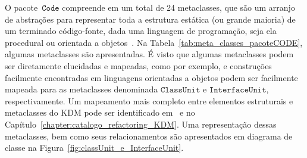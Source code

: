 
O pacote~$\mathtt{Code}$ compreende em um total de 24 metaclasses, que são um arranjo de abstrações para representar toda a estrutura estática (ou grande maioria) de um terminado código-fonte, dada uma linguagem de programação, seja ela procedural ou orientada a objetos~\cite{KDM:specification}. Na Tabela~\ref{tab:meta_classes_pacoteCODE}, algumas metaclasses são apresentadas. É visto que algumas metaclasses podem ser diretamente elucidadas e mapeadas, como por exemplo,  e  construções facilmente encontradas em linguagens orientadas a objetos podem ser facilmente mapeada para as metaclasses denominada $\mathtt{ClassUnit}$ e $\mathtt{InterfaceUnit}$, respectivamente. Um mapeamento mais completo entre elementos estruturais e metaclasses do KDM pode ser identificado em~ e no Capítulo~\ref{chapter:catalogo_refactoring_KDM}. Uma representação dessas metaclasses, bem como seus relacionamentos são apresentados em diagrama de classe na Figura~\ref{fig:classUnit_e_InterfaceUnit}.

